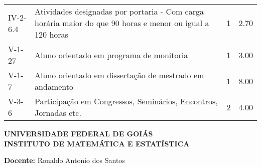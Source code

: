 \documentclass[11pt,a4paper]{article}
\begin{document}
\begin{table}[ht]
\begin{tabular}{|l|p{12cm}|r|r|}
  IV-2-6.4 & Atividades designadas por portaria - Com carga horária maior do que 90 horas e menor ou igual a 120 horas &   1 & 2.70 \\ 
  V-1-27 & Aluno orientado em programa de monitoria &   1 & 3.00 \\ 
  V-1-7 & Aluno orientado em dissertação de mestrado em andamento &   1 & 8.00 \\ 
  V-3-6 & Participação em Congressos, Seminários, Encontros, Jornadas etc. &   2 & 4.00 \\ 
   \hline
\end{tabular}
\end{table}


\newpage

\begin{center}
  \textbf{UNIVERSIDADE FEDERAL DE GOIÁS\\
  INSTITUTO DE MATEMÁTICA E ESTATÍSTICA}
\end{center}

\noindent\textbf{Docente:}
Ronaldo Antonio dos Santos
\end{document}
